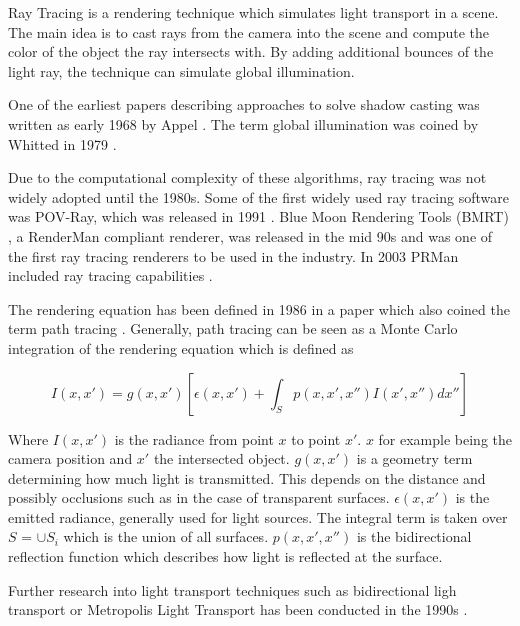 Ray Tracing is a rendering technique which simulates light transport in a scene. The main idea is to cast rays from the camera into the scene and compute the color of the object the ray intersects with. By adding additional bounces of the light ray, the technique can simulate global illumination.

One of the earliest papers describing approaches to solve shadow casting was written as early 1968 by Appel \cite{appel1968shading}. The term global illumination was coined by Whitted in 1979 \cite{whitted2020OriginsOfGlobalIllumination}.

Due to the computational complexity of these algorithms, ray tracing was not widely adopted until the 1980s. Some of the first widely used ray tracing software was POV-Ray, which was released in 1991 \cite{POV_Ray_Documentation}. Blue Moon Rendering Tools (BMRT) \cite{bmrt}, a RenderMan compliant renderer, was released in the mid 90s and was one of the first ray tracing renderers to be used in the industry. In 2003 PRMan included ray tracing capabilities \cite{RenderMan_11_Release_Notes}.

The rendering equation has been defined in 1986 in a paper which also coined the term path tracing \cite{kajiya1986rendering}. Generally, path tracing can be seen as a Monte Carlo integration of the rendering equation which is defined as

\begin{equation}
  \label{eqn:rendering-equation}
  I(x, x') = g(x, x') [\epsilon(x, x') + \int_{S} p(x, x', x'')I(x', x'')dx'']
\end{equation}

Where $I(x, x')$ is the radiance from point $x$ to point $x'$. $x$ for example being the camera position and $x'$ the intersected object. $g(x, x')$ is a geometry term determining how much light is transmitted. This depends on the distance and possibly occlusions such as in the case of transparent surfaces. $\epsilon(x, x')$ is the emitted radiance, generally used for light sources. The integral term is taken over $S$ = $\cup S_i$ which is the union of all surfaces. $p(x, x', x'')$ is the bidirectional reflection function which describes how light is reflected at the surface. \cite{kajiya1986rendering}

Further research into light transport techniques such as bidirectional ligh transport or Metropolis Light Transport has been conducted in the 1990s \cite{veachMonteCarloLightTransport}.


